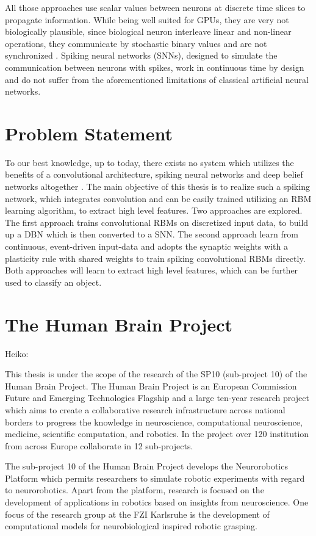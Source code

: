 All those approaches use scalar values between neurons at discrete time slices to propagate information. 
While being well suited for GPUs, they are very not biologically plausible, since biological neuron interleave linear and non-linear operations, they communicate by stochastic binary values and are not synchronized \cite{bengio2015towards}. 
Spiking neural networks (SNNs), designed to simulate the communication between neurons with spikes, work in continuous time by design and do not suffer from the aforementioned limitations of classical artificial neural networks.

\section{Problem Statement}

To our best knowledge, up to today, there exists no system which utilizes the benefits of a convolutional architecture, spiking neural networks and deep belief networks altogether . 
The main objective of this thesis is to realize such a spiking network, which integrates convolution and can be easily trained utilizing an RBM learning algorithm, to extract high level features. 
Two approaches are explored. 
The first approach trains convolutional RBMs on discretized input data, to build up a DBN which is then converted to a SNN. 
The second approach learn from continuous, event-driven input-data and adopts the synaptic weights with a plasticity rule with shared weights to train spiking convolutional RBMs directly. 
Both approaches will learn to extract high level features, which can be further used to classify an object. 

\section{The Human Brain Project}

Heiko:

This thesis is under the scope of the research of the SP10 (sub-project 10) of the Human Brain
Project. The Human Brain Project is an European Commission Future and Emerging Technologies Flagship and a large ten-year research project which aims to create a collaborative research infrastructure across national borders to progress the knowledge in neuroscience, computational neuroscience, medicine, scientific computation, and robotics. In the project over 120
institution from across Europe collaborate in 12 sub-projects.

The sub-project 10 of the Human Brain Project develops the Neurorobotics Platform which
permits researchers to simulate robotic experiments with regard to neurorobotics. Apart from the
platform, research is focused on the development of applications in robotics based on insights
from neuroscience. One focus of the research group at the FZI Karlsruhe is the development of
computational models for neurobiological inspired robotic grasping.


